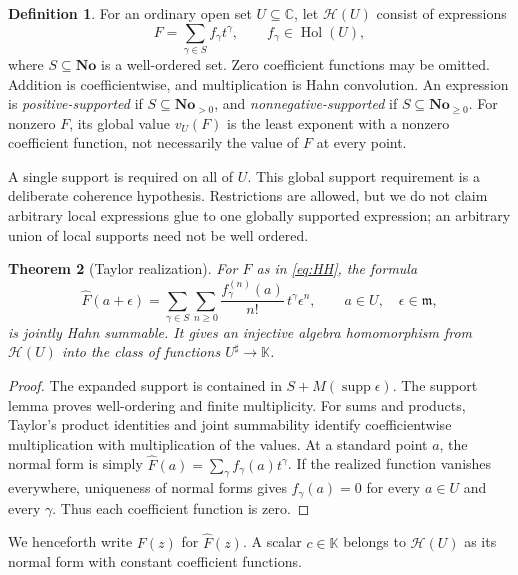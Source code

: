\documentclass[11pt,letterpaper]{article}
\numberwithin{equation}{section}
\newtheorem{theorem}{Theorem}[section]
\theoremstyle{definition}
\newtheorem{definition}[theorem]{Definition}
\theoremstyle{remark}
\newcommand{\No}{\mathbf{No}}
\newcommand{\K}{\mathbb{K}}
\newcommand{\C}{\mathbb{C}}
\newcommand{\mm}{\mathfrak{m}}
\newcommand{\HH}{\mathcal{H}}
\newcommand{\supp}{\operatorname{supp}}
\newcommand{\Hol}{\operatorname{Hol}}
\begin{document}
\begin{definition}\label{def:HH}
For an ordinary open set $U\subseteq\C$, let $\HH(U)$ consist of expressions
\begin{equation}\label{eq:HH}
 F=\sum_{\gamma\in S} f_\gamma t^\gamma,
 \qquad f_\gamma\in\Hol(U),
\end{equation}
where $S\subseteq\No$ is a well-ordered set. Zero coefficient functions may
be omitted. Addition is coefficientwise, and multiplication is Hahn
convolution. An expression is \emph{positive-supported} if $S\subseteq
\No_{>0}$, and \emph{nonnegative-supported} if $S\subseteq\No_{\ge0}$.
For nonzero $F$, its global value $v_U(F)$ is the least exponent with a
nonzero coefficient function, not necessarily the value of $F$ at every point.
\end{definition}

A single support is required on all of $U$. This global support requirement
is a deliberate coherence hypothesis. Restrictions are allowed, but we do not
claim arbitrary local expressions glue to one globally supported expression;
an arbitrary union of local supports need not be well ordered.

\begin{theorem}[Taylor realization]\label{thm:realization}
For $F$ as in \eqref{eq:HH}, the formula
\begin{equation}\label{eq:evaluation}
 \widehat F(a+\epsilon)=
 \sum_{\gamma\in S}\sum_{n\ge0}
 \frac{f_\gamma^{(n)}(a)}{n!}\,t^\gamma\epsilon^n,
 \qquad a\in U,\quad\epsilon\in\mm,
\end{equation}
is jointly Hahn summable. It gives an injective algebra homomorphism from
$\HH(U)$ into the class of functions $U^\sharp\to\K$.
\end{theorem}
\begin{proof}
The expanded support is contained in $S+M(\supp\epsilon)$.
The support lemma proves well-ordering and finite multiplicity. For sums and
products, Taylor's product identities and joint summability identify
coefficientwise multiplication with multiplication of the values.
At a standard point $a$, the normal form is simply
$\widehat F(a)=\sum_\gamma f_\gamma(a)t^\gamma$. If the realized function
vanishes everywhere, uniqueness of normal forms gives $f_\gamma(a)=0$ for
every $a\in U$ and every $\gamma$. Thus each coefficient function is zero.
\end{proof}

We henceforth write $F(z)$ for $\widehat F(z)$. A scalar $c\in\K$ belongs to
$\HH(U)$ as its normal form with constant coefficient functions.
\end{document}
